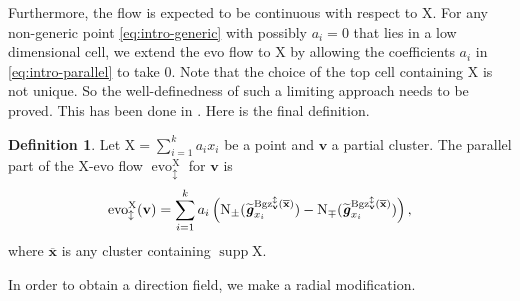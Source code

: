 \documentclass[11pt,reqno]{amsart}
\newcommand{\Qy}[1]{\textcolor{blue!50!cyan}{#1}}
\theoremstyle{plain}
\theoremstyle{definition}
\newtheorem{definition}[theorem]{Definition}
\numberwithin{equation}{section}
\newcommand\<{\langle}
\renewcommand\>{\rangle}
\newcommand{\on}[1]{\operatorname{#1}}
\def\vv{\mathbf{v}}
\def\sink{X}
\newcommand{\flowd}[1]{\on{evo}^{#1}_{\downarrow}}
\newcommand{\flowu}[1]{\on{evo}^{#1}_{\uparrow}}
\newcommand{\flowdu}[1]{\on{evo}_{\updownarrow}^{#1}}
\newcommand{\ccpt}[1]{\mathrm{#1}}%
\def\xevo{\ccpt{X}}%
\newcommand{\bfit}[1]{\textbf{\textit{#1}}}
\def\xx{\mathbf{x}}%
\def\gvec{\bfit{g}}
\def\supp{\on{supp}}
\newcommand{\Bgzm}[2]{\operatorname{Bgz}^{\downarrow}_{#2}(#1)}
\newcommand{\Bgzpm}[2]{\operatorname{Bgz}^{\updownarrow}_{#2}(#1)}
\newcommand{\ol}[1]{\overline{#1}}
\newcommand{\DT}[1]{#1^{\vee}}
\def\Xevo{\DT{\ccpt{X}}}
\def\normal{\on{N}}
\def\tgvec{\widetilde{\gvec}}
\begin{document}
Furthermore, the flow is expected to be continuous with respect to $\xevo$. 
For any non-generic point \eqref{eq:intro-generic} with possibly $a_i=0$
that lies in a low dimensional cell, 
we extend the evo flow to $\xevo$ by allowing the coefficients $a_i$ in \eqref{eq:intro-parallel} to take $0$.
Note that the choice of the top cell containing $\xevo$ is not unique.
So the well-definedness of such a limiting approach needs to be proved.
This has been done in .
Here is the final definition.
\begin{definition}
Let $\xevo=\sum_{i=1}^k a_i x_i$ be a point and $\vv$ a partial cluster. The parallel part of the $\xevo$-evo flow $\flowdu{\xevo}$ for $\vv$ is
\begin{equation}\label{eq:intro-parallel3}
\begin{aligned}
\flowdu{\xevo}(\vv)
 =\sum_{i=1}^k a_i\left(
   \normal_\pm(\tgvec_{x_i}^{\Bgzpm{\ol{\xx}}{\vv}})
  -\normal_\mp(\tgvec_{x_i}^{\Bgzpm{\ol{\xx}}{\vv}})\right),
\end{aligned}
\end{equation}
where $\ol{\xx}$ is any cluster containing $\supp\xevo$. %
\end{definition}

In order to obtain a direction field, we make a radial modification. %
\end{document}
